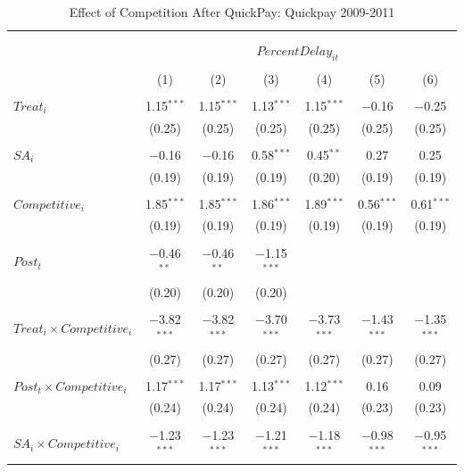 \documentclass[
]{article}
\begin{document}
\begin{table}[H] \centering 
  \caption{Effect of Competition After QuickPay: Quickpay 2009-2011} 
  \label{} 
\small 
\begin{tabular}{@{\extracolsep{-3pt}}lcccccc} 
\\[-1.8ex]\hline 
\hline \\[-1.8ex] 
\\[-1.8ex] & \multicolumn{6}{c}{$PercentDelay_{it}$  } \\ 
\\[-1.8ex] & (1) & (2) & (3) & (4) & (5) & (6)\\ 
\hline \\[-1.8ex] 
 $Treat_i$ & 1.15$^{***}$ & 1.15$^{***}$ & 1.13$^{***}$ & 1.15$^{***}$ & $-$0.16 & $-$0.25 \\ 
  & (0.25) & (0.25) & (0.25) & (0.25) & (0.25) & (0.25) \\ 
  & & & & & & \\ 
 $SA_i$ & $-$0.16 & $-$0.16 & 0.58$^{***}$ & 0.45$^{**}$ & 0.27 & 0.25 \\ 
  & (0.19) & (0.19) & (0.19) & (0.20) & (0.19) & (0.19) \\ 
  & & & & & & \\ 
 $Competitive_i$ & 1.85$^{***}$ & 1.85$^{***}$ & 1.86$^{***}$ & 1.89$^{***}$ & 0.56$^{***}$ & 0.61$^{***}$ \\ 
  & (0.19) & (0.19) & (0.19) & (0.19) & (0.19) & (0.19) \\ 
  & & & & & & \\ 
 $Post_t$ & $-$0.46$^{**}$ & $-$0.46$^{**}$ & $-$1.15$^{***}$ &  &  &  \\ 
  & (0.20) & (0.20) & (0.20) &  &  &  \\ 
  & & & & & & \\ 
 $Treat_i \times Competitive_i$ & $-$3.82$^{***}$ & $-$3.82$^{***}$ & $-$3.70$^{***}$ & $-$3.73$^{***}$ & $-$1.43$^{***}$ & $-$1.35$^{***}$ \\ 
  & (0.27) & (0.27) & (0.27) & (0.27) & (0.27) & (0.27) \\ 
  & & & & & & \\ 
 $Post_t \times Competitive_i$ & 1.17$^{***}$ & 1.17$^{***}$ & 1.13$^{***}$ & 1.12$^{***}$ & 0.16 & 0.09 \\ 
  & (0.24) & (0.24) & (0.24) & (0.24) & (0.23) & (0.23) \\ 
  & & & & & & \\ 
 $SA_i \times Competitive_i$ & $-$1.23$^{***}$ & $-$1.23$^{***}$ & $-$1.21$^{***}$ & $-$1.18$^{***}$ & $-$0.98$^{***}$ & $-$0.95$^{***}$ \\ 

\end{tabular}
\end{table}
\end{document}
